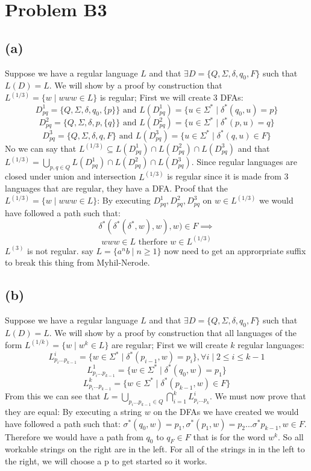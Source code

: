 \documentclass[12pt]{article}
\begin{document}
\section*{Problem B3}
\subsection*{(a)}
Suppose we have a regular language $L$ and that $\exists
D = \{Q, \Sigma, \delta, q_0, F\}$ such that $L(D) = L$.
We will show by a proof by construction that
$L^{(1/3)} = \{ w \mid www \in L\}$ is regular;
\newline First we will create 3 DFAs:
$$D^1_{pq} = \{Q, \Sigma, \delta, q_0, \{p\}\} \text{ and }
L(D^1_{pq}) = \{u \in \Sigma^* \mid \delta^* (q_0,u) = p\}$$
$$D^2_{pq} = \{Q, \Sigma, \delta, p, \{q\}\} \text{ and }
L(D^2_{pq}) = \{u \in \Sigma^* \mid \delta^* (p,u) = q\}$$
$$D^3_{pq} = \{Q, \Sigma, \delta, q, F\} \text{ and }
L(D^3_{pq}) = \{u \in \Sigma^* \mid \delta^* (q,u) \in F\}$$
No we can say that
$L^{(1/3)} \subseteq L(D^1_{pq}) \cap L(D^2_{pq}) \cap L(D^3_{pq})$ and that
$L^{(1/3)} = \bigcup_{p,q \in Q}
L(D^1_{pq}) \cap L(D^2_{pq}) \cap L(D^3_{pq})$.
Since regular languages are closed under union and intersection
$L^{(1/3)}$ is regular since it is made from 3 languages that are regular,
they have a DFA. \newline
Proof that the $L^{(1/3)} = \{ w \mid www \in L\}$:\newline
By executing  $D^1_{pq} , D^2_{pq} , D^3_{pq}$ on $w \in L^{(1/3)}$
we would have followed a path such that:
$$\delta^*(\delta^*(\delta^*, w), w), w) \in F \implies$$
$$www \in L \text{ therfore }w \in L^{(1/3)}$$
\newline $L^{(3)}$ is not regular. say $L = \{a^nb \mid n \ge 1\}$
now need to get an approrpriate suffix to break this thing from Myhil-Nerode.
\subsection*{(b)}
Suppose we have a regular language $L$ and that $\exists    D = \{Q, \Sigma,
\delta, q_0, F\}$ such that $L(D) = L$.
We will show by a proof by construction that all languages of the form
$L^{(1/k)} = \{ w \mid w^k \in L\}$ are regular;
\newline First we will create $k$ regular languages:
$$L^i_{p_i...p_{k-1}} = \{ w \in \Sigma^* \mid \delta^*(p_{i-1},w) = p_i\},
\forall i \mid 2 \le i \le k-1 $$
$$L^1_{p_i...p_{k-1}} = \{ w \in \Sigma^* \mid \delta^*(q_0,w) = p_1\}$$
$$L^k_{p_i...p_{k-1}} = \{ w \in \Sigma^* \mid \delta^*(p_{k-1},w) \in F\}$$
From this we can see that
$L = \bigcup_{p_i...p_{k-1} \in Q} \bigcap^k_{i=1} L^i_{p_i...p_k}$.
We must now prove that they are equal:
\newline
By executing a string $w$ on the DFAs we have created we would have followed
a path such that:
$\sigma^*(q_0,w) = p_1 , \sigma^*(p_1, w) = p_2 ... \sigma^*{p_{k-1}, w} \in F$.
Therefore we would have a path from $q_0$ to $q_F \in F$ that is for the word
$w^k$. So all workable strings on the right are in the left.
\newline
For all of the strings in in the left to the right,
we will choose a p to get started so it works.
\end{document}
